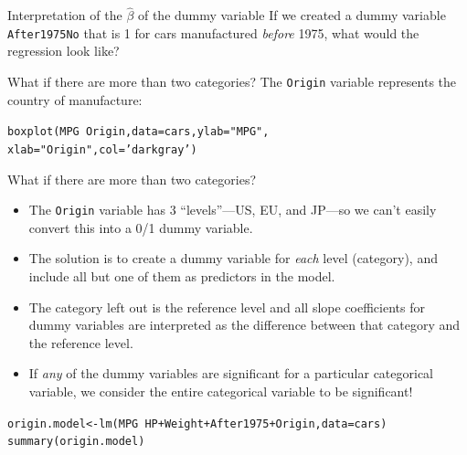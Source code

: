 \documentclass{beamer}\usepackage[]{graphicx}\usepackage[]{color}
\makeatletter
\newcommand{\hlstr}[1]{\textcolor[rgb]{1,0.894,0.71}{#1}}%
\newcommand{\hlopt}[1]{\textcolor[rgb]{1,0.894,0.769}{#1}}%
\newcommand{\hlstd}[1]{\textcolor[rgb]{1,0.894,0.769}{#1}}%
\newcommand{\hlkwb}[1]{\textcolor[rgb]{0.804,0.776,0.451}{#1}}%
\newcommand{\hlkwc}[1]{\textcolor[rgb]{0.78,0.941,0.545}{#1}}%
\newcommand{\hlkwd}[1]{\textcolor[rgb]{1,0.78,0.769}{#1}}%
\newenvironment{kframe}{%
 \def\at@end@of@kframe{}%
 \ifinner\ifhmode%
  \def\at@end@of@kframe{\end{minipage}}%
  \begin{minipage}{\columnwidth}%
 \fi\fi%
 \def\FrameCommand##1{\hskip\@totalleftmargin \hskip-\fboxsep
 \colorbox{shadecolor}{##1}\hskip-\fboxsep
     \hskip-\linewidth \hskip-\@totalleftmargin \hskip\columnwidth}%
 \MakeFramed {\advance\hsize-\width
   \@totalleftmargin\z@ \linewidth\hsize
   \@setminipage}}%
 {\par\unskip\endMakeFramed%
 \at@end@of@kframe}
\newenvironment{knitrout}{}{} %
\makeatother
\begin{document}
\begin{darkframes}
\begin{frame}[fragile]{Interpretation of the $\hat\beta$ of the dummy variable}
      If we created a dummy variable \texttt{After1975No} that is 1 for cars manufactured \emph{before} 1975, what would the regression look like?
    \end{frame}

    \begin{frame}[fragile]{What if there are more than two categories?}
      The \texttt{Origin} variable represents the country of manufacture:
\begin{knitrout}
\begin{kframe}
\begin{alltt}
\hlkwd{boxplot}\hlstd{(MPG} \hlopt{~} \hlstd{Origin,} \hlkwc{data}\hlstd{=cars,} \hlkwc{ylab}\hlstd{=}\hlstr{"MPG"}\hlstd{,}
              \hlkwc{xlab}\hlstd{=}\hlstr{"Origin"}\hlstd{,} \hlkwc{col}\hlstd{=}\hlstr{'darkgray'}\hlstd{)}
\end{alltt}
\end{kframe}


\end{knitrout}
    \end{frame}

    \begin{frame}[fragile]{What if there are more than two categories?}
      \begin{itemize}[<+->]
        \item The \texttt{Origin} variable has 3 ``levels''---US, EU, and JP---so we can't easily convert this into a 0/1 dummy variable.
        \item The solution is to create a dummy variable for \emph{each} level (category), and include \alert{all but one} of them as predictors in the model.
        \item The category left out is the \alert{reference level} and all slope coefficients for dummy variables are interpreted as the difference between that category and the reference level.
        \item If \emph{any} of the dummy variables are significant for a particular categorical variable, we consider the entire categorical variable to be significant!
      \end{itemize}
    \end{frame}

    \begin{frame}[fragile]
      \fontsm\vspace{-0.15in}
\begin{knitrout}
\begin{kframe}
\begin{alltt}
\hlstd{origin.model} \hlkwb{<-} \hlkwd{lm}\hlstd{(MPG} \hlopt{~} \hlstd{HP} \hlopt{+} \hlstd{Weight} \hlopt{+} \hlstd{After1975} \hlopt{+} \hlstd{Origin,} \hlkwc{data}\hlstd{=cars)}
\hlkwd{summary}\hlstd{(origin.model)}
\end{alltt}
\begin{verbatim}


\end{verbatim}
\end{kframe}
\end{knitrout}
\end{frame}
\end{darkframes}
\end{document}
